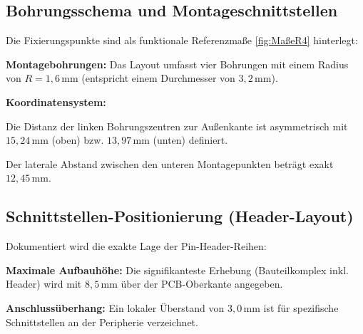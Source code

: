 \subsection{Bohrungsschema und Montageschnittstellen}

Die Fixierungspunkte sind als funktionale Referenzmaße \ref{fig:MaßeR4} hinterlegt:
\begin{itemize}{
		\item \textbf{Montagebohrungen:} 
		Das Layout umfasst vier Bohrungen mit einem Radius von $R = 1,6\,\text{mm}$ (entspricht einem Durchmesser von $3,2\,\text{mm}$).
		\item \textbf{Koordinatensystem:} 
		\begin{itemize}{
			\item	Die Distanz der linken Bohrungszentren zur Außenkante ist 	asymmetrisch mit $15,24\,\text{mm}$ (oben) bzw. $13,97\,\text{mm}$ (unten) definiert.
			\item 	Der laterale Abstand zwischen den unteren Montagepunkten beträgt exakt $12,45\,\text{mm}$.
		} \end{itemize}
} \end{itemize}

\subsection{Schnittstellen-Positionierung (Header-Layout)}

Dokumentiert wird die exakte Lage der Pin-Header-Reihen:
\begin{itemize}{
		\item \textbf{Maximale Aufbauhöhe:} 
		Die signifikanteste Erhebung (Bauteilkomplex inkl. Header) wird mit $8,5\,\text{mm}$ über der PCB-Oberkante angegeben.
		\item \textbf{Anschlussüberhang:} 
		Ein lokaler Überstand von $3,0\,\text{mm}$ ist für spezifische Schnittstellen an der Peripherie verzeichnet.
} \end{itemize}
\cite{Arduino:2026}










